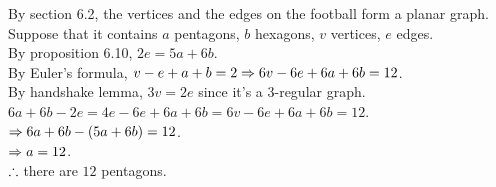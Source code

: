 \setcounter{pr}{3}
\begin{pr}
By section 6.2, the vertices and the edges on the football form a planar graph.\\
Suppose that it contains $a$ pentagons, $b$ hexagons, $v$ vertices, $e$ edges.\\
By proposition 6.10, $2e=5a+6b$.\\
By Euler's formula, $v-e+a+b=2\Rightarrow 6v-6e+6a+6b=12$.\\
By handshake lemma, $3v=2e$ since it's a $3$-regular graph.\\
$6a+6b-2e=4e-6e+6a+6b=6v-6e+6a+6b=12$.\\
$\Rightarrow 6a+6b-(5a+6b)=12$.\\
$\Rightarrow a=12$.\\
$\therefore$ there are $12$ pentagons.
\end{pr}
